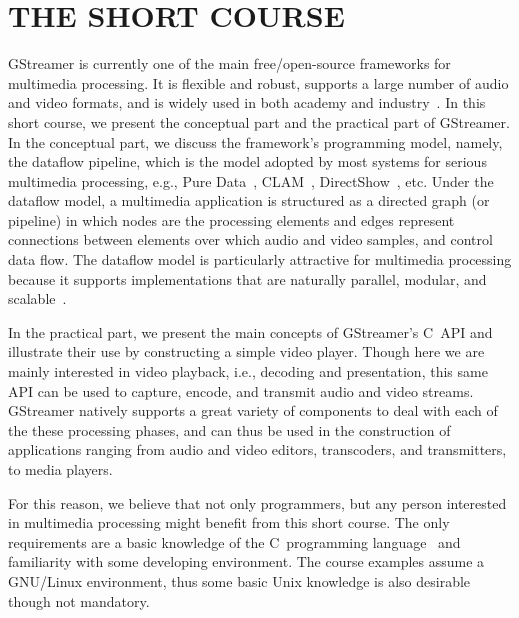 \documentclass{sig-alternate-05-2015}
\begin{document}
\printccsdesc
{}


\section*{THE SHORT COURSE}

\noindent
GStreamer is currently one of the main free/open-source frameworks for
multimedia processing.  It is flexible and robust, supports a large number
of audio and video formats, and is widely used in both academy and
industry~\cite{gstreamer-apps}.  In this short course, we present the
conceptual part and the practical part of GStreamer.  In the conceptual
part, we discuss the framework's programming model, namely, the dataflow
pipeline, which is the model adopted by most systems for serious multimedia
processing, e.g., Pure Data~\cite{Puckette-M-S-2007},
CLAM~\cite{Amatriain-X-2008}, DirectShow~\cite{Chatterjee-A-1997}, etc.
Under the dataflow model, a multimedia application is structured as a
directed graph (or pipeline) in which nodes are the processing elements and
edges represent connections between elements over which audio and video
samples, and control data flow.  The dataflow model is particularly
attractive for multimedia processing because it supports implementations
that are naturally parallel, modular, and scalable~\cite{Yviquel-H-2014}.

In the practical part, we present the main concepts of GStreamer's C~API and
illustrate their use by constructing a simple video player.  Though here we
are mainly interested in video playback, i.e., decoding and presentation,
this same API can be used to capture, encode, and transmit audio and video
streams.  GStreamer natively supports a great variety of components to deal
with each of the these processing phases, and can thus be used in the
construction of applications ranging from audio and video editors,
transcoders, and transmitters, to media players.

For this reason, we believe that not only programmers, but any person
interested in multimedia processing might benefit from this short course.
The only requirements are a basic knowledge of the C~programming
language~\cite{Kernighan-B-W-1988} and familiarity with some developing
environment.  The course examples assume a GNU/Linux environment, thus some
basic Unix knowledge is also desirable though not mandatory.
\end{document}
